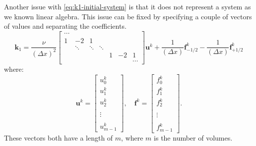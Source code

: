 Another issue with \cref{eq:k1-initial-system} is that it does not represent a system as we known linear algebra.
This issue can be fixed by specifying a couple of vectors of values and separating the coefficients.
\begin{equation}
    \label{eq:k1-systems}
    \mathbf{k}_1 = \frac{\nu }{(\Delta x)^2}\begin{bmatrix}
                                                \cdots &        &        &        &   &    &        \\
                                                1      & -2     & 1      &        &   &    &        \\
                                                & \ddots & \ddots & \ddots &   &    &        \\
                                                &        &        &        & 1 & -2 & 1      \\
                                                &        &        &        &   &    & \cdots
    \end{bmatrix}\mathbf{u}^k
    +\frac{1}{(\Delta x)}\mathbf{f}^k_{-1/2}-\frac{1}{(\Delta x)}\mathbf{f}_{+1/2}^k
\end{equation}
where:
\begin{equation}
    \label{eq:u_vec-and-f_vec-definition}
    \mathbf{u}^k = \begin{bmatrix}
                       u_0^k  \\
                       u_1^k  \\
                       u_2^k  \\
                       \\
                       \vdots\\\\
                       u_{m-1}^k
    \end{bmatrix},\quad
    \mathbf{f}^k = \begin{bmatrix}
                       f_0^k  \\
                       f_1^k  \\
                       f_2^k  \\
                       \\
                       \vdots\\\\
                       f_{m-1}^k
    \end{bmatrix}.
\end{equation}
These vectors both have a length of $m$, where $m$ is the number of volumes.
